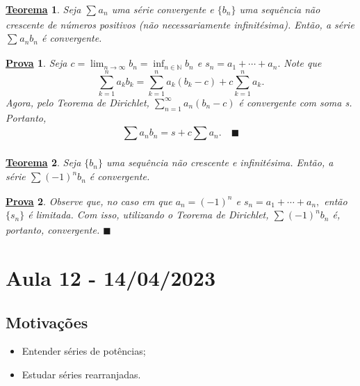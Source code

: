 \documentclass{article}
\newtheorem*{theorem*}{\underline{Teorema}}
\newtheorem*{proof*}{\underline{Prova}}
\renewcommand\qedsymbol{$\blacksquare$}
\begin{document}
\begin{theorem*}
  Seja $\sum\limits_{}^{}a_{n}$ uma s\'erie convergente e $\{b_{n}\}$ uma sequ\^encia n\~ao crescente de n\'umeros positivos
(n\~ao necessariamente infinit\'esima). Ent\~ao, a s\'erie $\sum\limits_{}^{}a_{n}b_{n}$ \'e convergente.
\end{theorem*}
\begin{proof*}
  Seja $c = \lim_{n\to\infty}b_{n} = \inf_{n\in \mathbb{N}}b_{n}$ e $s_{n} = a_{1} + \cdots + a_{n}.$ Note que 
    $$
      \sum\limits_{k=1}^{n}a_{k}b_{k} = \sum\limits_{k=1}^{n}a_{k}(b_{k}-c) + c \sum\limits_{k=1}^{n}a_{k}.
    $$
  Agora, pelo Teorema de Dirichlet, $\sum\limits_{n=1}^{\infty}a_{n}(b_{n}-c)$ \'e convergente com soma s. Portanto, 
    $$
    \sum\limits_{}^{}a_{n}b_{n} = s + c \sum\limits_{}^{}a_{n}.\quad\text{\qedsymbol}
    $$
\end{proof*}
\begin{theorem*}
  Seja $\{b_{n}\}$ uma sequ\^encia n\~ao crescente e infinit\'esima. Ent\~ao, a s\'erie $\sum\limits_{}^{}(-1)^{n}b_{n}$ \'e convergente.
\end{theorem*}
\begin{proof*}
  Observe que, no caso em que $a_{n} = (-1)^{n}$ e $s_{n} = a_{1} + \cdots + a_{n},$ ent\~ao $\{s_{n}\}$ \'e limitada. Com isso,
  utilizando o Teorema de Dirichlet, $\sum\limits_{}^{}(-1)^{n}b_{n}$ \'e, portanto, convergente. \qedsymbol
\end{proof*}
\newpage

\section{Aula 12 - 14/04/2023}
\subsection{Motiva\c c\~oes}
\begin{itemize}
  \item Entender s\'eries de pot\^encias;
  \item Estudar s\'eries rearranjadas.
\end{itemize}
\end{document}
